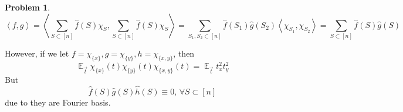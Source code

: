 \documentclass[a4paper]{article}
\theoremstyle{definition}
\newtheorem{problem}{Problem}
\theoremstyle{plain}
\newcommand{\Ebb}{\mathop\mathbb E}
\newcommand{\<}{\left<}
\renewcommand{\>}{\right>}
\numberwithin{equation}{problem}
\begin{document}
\begin{problem}
    \[\<f,g\>=\<\sum_{S\subset [n]}\hat{f}(S)\chi_S,\sum_{S\subset [n]}\hat{f}(S)\chi_S\>=\sum_{S_1,S_2\subset [n]}\hat{f}(S_1)\hat{g}(S_2)\<\chi_{S_1},\chi_{S_2}\>=\sum_{S\subset [n]}\hat{f}(S)\hat{g}(S)\]

    However, if we let  $ f=\chi_{\{x\}},g=\chi_{\{y\}},h=\chi_{\{x,y\}} $, then 
    \[\Ebb_{\vec{t}}\chi_{\{x\}}(t)\chi_{\{y\}}(t)\chi_{\{x,y\}}(t)=\Ebb_{\vec{t}}t_x^2t_y^2\]
    But 
    \[\hat{f}(S)\hat{g}(S)\hat{h}(S)\equiv 0,\,\forall S\subset [n]\]
    due to they are Fourier basis.
\end{problem}
\end{document}
